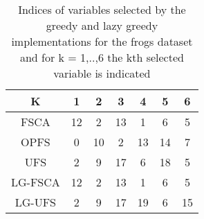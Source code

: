 \begin{table}
	\begin{center}
		\begin{tabular}{c c c c c c c}
			K & 1 & 2 & 3 & 4 & 5 & 6 \\
			\hline
			FSCA & 12 & 2 & 13 & 1 & 6 & 5 \\
			OPFS & 0 & 10 & 2 & 13 & 14 & 7 \\
			UFS & 2 & 9 & 17 & 6 & 18 & 5 \\
			LG-FSCA & 12 & 2 & 13 & 1 & 6 & 5 \\
			LG-UFS & 2 & 9 & 17 & 19 & 6 & 15 \\
		\end{tabular}
	\end{center}
	\caption{Indices of variables selected by the greedy and lazy greedy implementations for the frogs dataset and for k = 1,..,6 the kth selected variable is indicated}
\end{table}